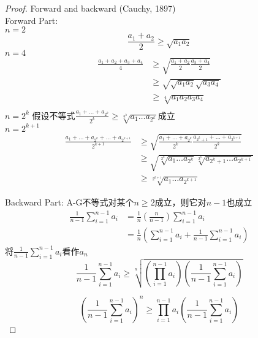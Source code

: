 \begin{proof}\label{证明 2}
Forward and backward (Cauchy, 1897)\\
Forward Part:\\
$ n=2 $ 
\begin{equation}
	\frac{a_1+a_2}{2}\geq \sqrt{a_1a_2}
\end{equation}
$ n=4 $ 
\begin{equation}
	\begin{aligned}
		\frac{a_1+a_2+a_3+a_4}{4}
		&\geq \sqrt{\frac{a_1+a_2}{2}\frac{a_3+a_4}{2}}\\
		&\geq \sqrt{\sqrt{a_1a_2}\sqrt{a_3a_4}}\\
		&\geq \sqrt[4]{a_1a_2a_3a_4}\\
	\end{aligned}
\end{equation}
$ n=2^k $ 假设不等式$ \frac{a_1+\dots +a_{2^k}}{2^k}\geq \sqrt[2^k]{a_1\dots a_{2^k}} $成立\\
$ n=2^{k+1} $
\begin{equation}
	\begin{aligned}
		\frac{a_1+\dots+a_{2^k}+\dots+a_{2^{k+1}}}{2^{k+1}}
		&\geq \sqrt{\frac{a_1+\dots +a_{2^k}}{2^k}\frac{a_{2^k+1}+\dots +a_{2^{k+1}}}{2^k}}\\
		&\geq \sqrt{\sqrt[2^k]{a_1\dots a_{2^k}}\sqrt[2^k]{a_{2^k+1}\dots a_{2^{k+1}}}}\\
		&\geq \sqrt[2^{k+1}]{a_1\dots a_{2^{k+1}}}
	\end{aligned}
\end{equation}

Backward Part:
A-G不等式对某个$ n\geq 2 $成立，则它对$ n-1 $也成立
\begin{equation}
	\begin{aligned}
		\frac{1}{n-1}\sum_{i=1}^{n-1}a_i 
		&= \frac{1}{n}(\frac{n}{n-1})\sum_{i=1}^{n-1}a_i\\
		&=\frac{1}{n}(\sum_{i=1}^{n-1}a_i+\frac{1}{n-1}\sum_{i=1}^{n-1}a_i)
	\end{aligned}
\end{equation}
将$ \frac{1}{n-1}\sum_{i=1}^{n-1}a_i $看作$ a_n $
\begin{equation}
	\frac{1}{n-1}\sum_{i=1}^{n-1}a_i
	\geq \sqrt[n]{(\prod_{i=1}^{n-1}a_i) (\frac{1}{n-1}\sum_{i=1}^{n-1}a_i)}
\end{equation}

\begin{equation}	
	(\frac{1}{n-1}\sum_{i=1}^{n-1}a_i)^n
	\geq \prod_{i=1}^{n-1}a_i(\frac{1}{n-1}\sum_{i=1}^{n-1}a_i)
\end{equation}



\end{proof}
